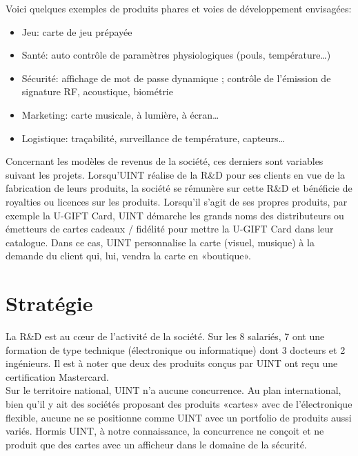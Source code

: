 Voici quelques exemples de produits phares et voies de développement envisagées:\\

\begin{itemize}
\item Jeu: carte de jeu prépayée
\item Santé: auto contrôle de paramètres physiologiques (pouls, température…)
\item Sécurité: affichage de mot de passe dynamique ; contrôle de l’émission de signature RF, acoustique, biométrie
\item Marketing: carte musicale, à lumière, à écran…
\item Logistique: traçabilité, surveillance de température, capteurs…\\
\end{itemize}

Concernant les modèles de revenus de la société, ces derniers sont variables suivant les projets. Lorsqu’UINT réalise de la R\&D pour ses clients en vue de la fabrication de leurs produits, la société se rémunère sur cette R\&D et bénéficie de royalties ou licences sur les produits. Lorsqu’il s’agit de ses propres produits, par exemple la U-GIFT Card, UINT démarche les grands noms des distributeurs ou émetteurs de cartes cadeaux / fidélité pour mettre la U-GIFT Card dans leur catalogue. Dans ce cas, UINT personnalise la carte (visuel, musique) à la demande du client qui, lui, vendra la carte en «boutique».

\section{Stratégie}

La R\&D est au cœur de l’activité de la société. Sur les 8 salariés, 7 ont une formation de type technique (électronique ou informatique) dont 3 docteurs et 2 ingénieurs. Il est à noter que deux des produits conçus par UINT ont reçu une certification Mastercard.\\ 

Sur le territoire national, UINT n’a aucune concurrence. Au plan international, bien qu’il y ait des sociétés proposant des produits «cartes» avec de l’électronique flexible, aucune ne se positionne comme UINT avec un portfolio de produits aussi variés. Hormis UINT, à notre connaissance, la concurrence ne conçoit et ne produit que des cartes avec un afficheur dans le domaine de la sécurité.\\

